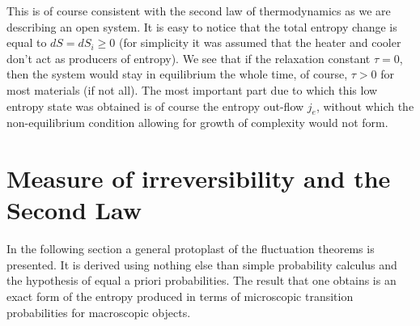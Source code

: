 \documentclass[a4paper,12pt]{article}
\begin{document}
This is of course consistent with the second law of thermodynamics as we are describing an open system.
It is easy to notice that the total entropy change is equal to $dS=dS_i \geq 0$ (for simplicity it was assumed that the heater and cooler don't act as producers of entropy).
We see that if the relaxation constant $\tau = 0$, then the system would stay in equilibrium the whole time, of course, $\tau > 0$ for most materials (if not all). The most important part due to which this low entropy state was obtained is of course the entropy out-flow $j_e$, without which the non-equilibrium condition allowing for growth of complexity would not form.

\section{Measure of irreversibility and the Second Law}
\label{IrreversibilityMeasureSection}
In the following section a general protoplast of the fluctuation theorems is presented. It is derived using nothing else than simple probability calculus and the hypothesis of equal a priori probabilities.
The result that one obtains is an exact form of the entropy produced in terms of microscopic transition probabilities for macroscopic objects.
\end{document}
